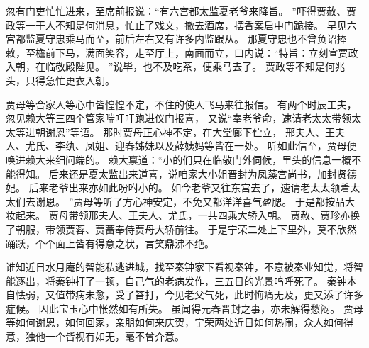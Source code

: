 忽有门吏忙忙进来，至席前报说：“有六宫都太监夏老爷来降旨。
”吓得贾赦、贾政等一干人不知是何消息，忙止了戏文，撤去酒席，摆香案启中门跪接。
早见六宫都监夏守忠乘马而至，前后左右又有许多内监跟从。
那夏守忠也不曾负诏捧敕，至檐前下马，满面笑容，走至厅上，南面而立，口内说：“特旨：立刻宣贾政入朝，在临敬殿陛见。
”说毕，也不及吃茶，便乘马去了。
贾政等不知是何兆头，只得急忙更衣入朝。
\par
贾母等合家人等心中皆惶惶不定，不住的使人飞马来往报信。
有两个时辰工夫，忽见赖大等三四个管家喘吁吁跑进仪门报喜，
又说“奉老爷命，速请老太太带领太太等进朝谢恩”等语。
那时贾母正心神不定，在大堂廊下伫立，
邢夫人、王夫人、尤氏、李纨、凤姐、迎春姊妹以及薛姨妈等皆在一处。
听如此信至，贾母便唤进赖大来细问端的。
赖大禀道：“小的们只在临敬门外伺候，里头的信息一概不能得知。
后来还是夏太监出来道喜，说咱家大小姐晋封为凤藻宫尚书，加封贤德妃。
后来老爷出来亦如此吩咐小的。
如今老爷又往东宫去了，速请老太太领着太太们去谢恩。
”贾母等听了方心神安定，不免又都洋洋喜气盈腮。
于是都按品大妆起来。
贾母带领邢夫人、王夫人、尤氏，一共四乘大轿入朝。
贾赦、贾珍亦换了朝服，带领贾蓉、贾蔷奉侍贾母大轿前往。
于是宁荣二处上下里外，莫不欣然踊跃，个个面上皆有得意之状，言笑鼎沸不绝。
\par
谁知近日水月庵的智能私逃进城，找至秦钟家下看视秦钟，不意被秦业知觉，将智能逐出，将秦钟打了一顿，自己气的老病发作，三五日的光景呜呼死了。
秦钟本自怯弱，又值带病未愈，受了笞打，今见老父气死，此时悔痛无及，更又添了许多症候。
因此宝玉心中怅然如有所失。
虽闻得元春晋封之事，亦未解得愁闷。
贾母等如何谢恩，如何回家，亲朋如何来庆贺，宁荣两处近日如何热闹，众人如何得意，独他一个皆视有如无，毫不曾介意。
